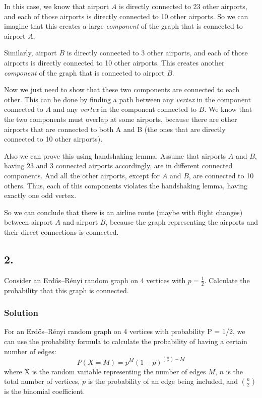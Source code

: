 \documentclass[a4paper]{article}
\begin{document}
\par
In this case, we know that airport \(A\) is directly connected to 23 other airports, and each of those airports is directly connected to 10 other airports. So we can imagine that this creates a large \textit{component} of the graph that is connected to airport \(A\). \\
\par
Similarly, airport \(B\) is directly connected to 3 other airports, and each of those airports is directly connected to 10 other airports. This creates another \textit{component} of the graph that is connected to airport \(B\). \\
\par
Now we just need to show that these two components are connected to each other. This can be done by finding a path between any \textit{vertex} in the component connected to \(A\) and any \textit{vertex} in the component connected to \(B\). We know that the two components must overlap at some airports, because there are other airports that are connected to both A and B (the ones that are directly connected to 10 other airports). \\
\par
Also we can prove this using handshaking lemma. Assume that airports \(A\) and \(B\), having 23 and 3 connected airports accordingly, are in different connected components. And all the other airports, except for \(A\) and \(B\), are connected to 10 others. Thus, each of this components violates the handshaking lemma, having exactly one odd vertex. \\
\par
So we can conclude that there is an airline route (maybe with flight changes) between airport \(A\) and airport \(B\), because the graph representing the airports and their direct connections is connected. \\
\subsection*{2.}
Consider an Erdős–Rényi random graph on 4 vertices with \(p=\frac{1}{2}\). Calculate the probability that this graph is connected.
\subsubsection*{Solution}
For an Erdős–Rényi random graph on 4 vertices with probability P = 1/2, we can use the probability formula to calculate the probability of having a certain number of edges:
\[
P(X=M) = p^M(1-p)^{\binom{n}{2}-M}
\]
where X is the random variable representing the number of edges \(M\), \(n\) is the total number of vertices, \(p\) is the probability of an edge being included, and \(\binom{n}{2}\)is the binomial coefficient. \\
\end{document}
